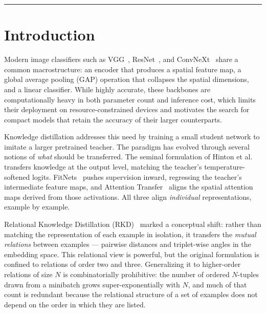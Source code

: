 \documentclass[11pt,letterpaper]{article}
\begin{document}
\bigskip
\hrule
\bigskip

\section{Introduction}
\label{sec:introduction}

Modern image classifiers such as VGG~\cite{simonyan2015vgg},
ResNet~\cite{he2016resnet}, and ConvNeXt~\cite{liu2022convnext} share a common
macrostructure: an encoder that produces a spatial feature map, a global average
pooling (GAP) operation that collapses the spatial dimensions, and a linear
classifier. While highly accurate, these backbones are computationally heavy in
both parameter count and inference cost, which limits their deployment on
resource-constrained devices and motivates the search for compact models that
retain the accuracy of their larger counterparts.

Knowledge distillation addresses this need by training a small student network to
imitate a larger pretrained teacher. The paradigm has evolved through several
notions of \emph{what} should be transferred. The seminal formulation of Hinton
et al.~\cite{hinton2015distilling} transfers knowledge at the output level, matching
the teacher's temperature-softened logits. FitNets~\cite{romero2015fitnets} pushes
supervision inward, regressing the teacher's intermediate feature maps, and
Attention Transfer~\cite{zagoruyko2017attention} aligns the spatial attention maps
derived from those activations. All three align \emph{individual} representations,
example by example.

Relational Knowledge Distillation (RKD)~\cite{park2019relational} marked a
conceptual shift: rather than matching the representation of each example in
isolation, it transfers the \emph{mutual relations} between examples --- pairwise
distances and triplet-wise angles in the embedding space. This relational view is
powerful, but the original formulation is confined to relations of order two and
three. Generalizing it to higher-order relations of size $N$ is combinatorially
prohibitive: the number of ordered $N$-tuples drawn from a minibatch grows
super-exponentially with $N$, and much of that count is redundant because the
relational structure of a set of examples does not depend on the order in which
they are listed.
\end{document}
